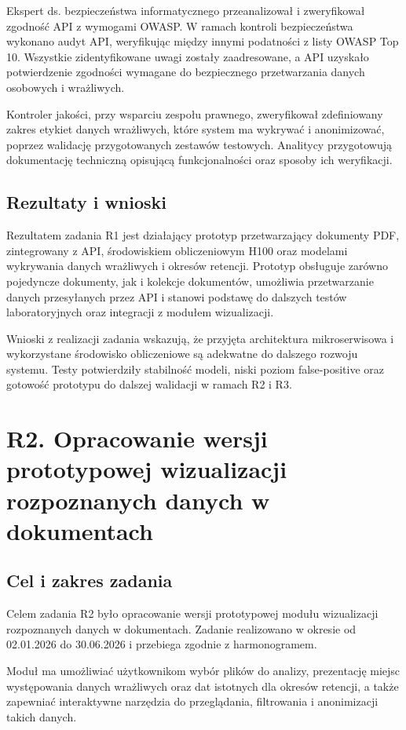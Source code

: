 \documentclass[12pt,a4paper]{report}
\begin{document}
Ekspert ds. bezpieczeństwa informatycznego przeanalizował i zweryfikował zgodność API z wymogami OWASP. W ramach kontroli bezpieczeństwa wykonano audyt API, weryfikując między innymi podatności z listy OWASP Top 10. Wszystkie zidentyfikowane uwagi zostały zaadresowane, a API uzyskało potwierdzenie zgodności wymagane do bezpiecznego przetwarzania danych osobowych i wrażliwych.

Kontroler jakości, przy wsparciu zespołu prawnego, zweryfikował zdefiniowany zakres etykiet danych wrażliwych, które system ma wykrywać i anonimizować, poprzez walidację przygotowanych zestawów testowych. Analitycy przygotowują dokumentację techniczną opisującą funkcjonalności oraz sposoby ich weryfikacji.

\subsection{Rezultaty i wnioski}
Rezultatem zadania R1 jest działający prototyp przetwarzający dokumenty PDF, zintegrowany z API, środowiskiem obliczeniowym H100 oraz modelami wykrywania danych wrażliwych i okresów retencji. Prototyp obsługuje zarówno pojedyncze dokumenty, jak i kolekcje dokumentów, umożliwia przetwarzanie danych przesyłanych przez API i stanowi podstawę do dalszych testów laboratoryjnych oraz integracji z modułem wizualizacji.

Wnioski z realizacji zadania wskazują, że przyjęta architektura mikroserwisowa i wykorzystane środowisko obliczeniowe są adekwatne do dalszego rozwoju systemu. Testy potwierdziły stabilność modeli, niski poziom false-positive oraz gotowość prototypu do dalszej walidacji w ramach R2 i R3.

\section{R2. Opracowanie wersji prototypowej wizualizacji rozpoznanych danych w dokumentach}
\subsection{Cel i zakres zadania}
Celem zadania R2 było opracowanie wersji prototypowej modułu wizualizacji rozpoznanych danych w dokumentach. Zadanie realizowano w okresie od 02.01.2026 do 30.06.2026 i przebiega zgodnie z harmonogramem.

Moduł ma umożliwiać użytkownikom wybór plików do analizy, prezentację miejsc występowania danych wrażliwych oraz dat istotnych dla okresów retencji, a także zapewniać interaktywne narzędzia do przeglądania, filtrowania i anonimizacji takich danych.
\end{document}

